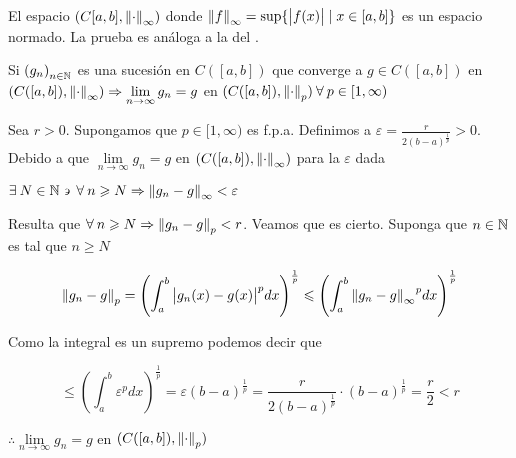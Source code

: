 \begin{corollary}
    El espacio $(C[a,b],{\norm{\cdot}}_{\infty})$ donde ${\norm{f}}_{\infty} = \sup \{ \abs{f(x)} \mid x \in [a,b] \}$ es un espacio normado. La prueba es análoga a la del .
\end{corollary}

\begin{eg}
    Si ${(g_n)}_{n \in \mathbb{N}}$ es una sucesión en $C([a,b])$ que converge a $g \in C([a,b])$ en $(C([a,b]),\norm{\cdot}_\infty) \Rightarrow \lim\limits_{n\to \infty} g_n = g$ en $(C([a,b]),\norm{\cdot}_p) \: \forall \: p \in [1,\infty)$
\end{eg}

\begin{proofexplanation}
    Sea $r>0$. Supongamos que $p \in [1,\infty)$ es f.p.a. Definimos a $\varepsilon = \frac{r}{2{(b-a)}^{\frac{1}{p}}} > 0$. Debido a que  $\lim\limits_{n\to \infty} g_n = g$ en $(C([a,b]),\norm{\cdot}_\infty)$ para la $\varepsilon$ dada

    $\exists \: N \in \mathbb{N} \backepsilon \: \forall \: n \geqslant N \Rightarrow \norm{g_n-g}_\infty < \varepsilon$

    Resulta que $\forall \: n \geqslant N \Rightarrow \norm{g_n-g}_p < r$. Veamos que es cierto. Suponga que $n \in \mathbb{N}$ es tal que $n \geqslant N$

    $$\norm{g_n-g}_p =  {\left( \int_{a}^{b} {\abs{g_n(x)-g(x)}}^{p} dx \right)}^{\frac{1}{p}} \leqslant {\left( \int_{a}^{b} {\norm{g_n-g}_\infty}^{p} dx \right)}^{\frac{1}{p}}$$

    Como la integral es un supremo podemos decir que
    
    $$\leqslant  {\left( \int_{a}^{b} {\varepsilon}^{p} dx \right)}^{\frac{1}{p}} = \varepsilon {(b-a)}^{\frac{1}{p}} = \frac{r}{2{(b-a)}^{\frac{1}{p}}} \cdot {(b-a)}^{\frac{1}{p}} = \frac{r}{2} < r$$

    $\therefore \lim\limits_{n\to \infty} g_n = g$ en $(C([a,b]),\norm{\cdot}_p)$
\end{proofexplanation}

